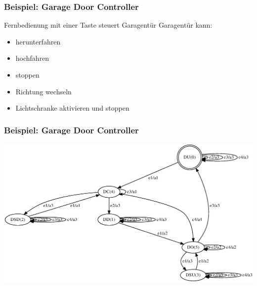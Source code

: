 \documentclass[10pt]{beamer}
\begin{document}
\begin{frame}
\frametitle{Beispiel: Garage Door Controller}
Fernbedienung mit einer Taste steuert Garagentür
Garagentür kann:
\begin{itemize}
	\item herunterfahren
	\item hochfahren
	\item stoppen
	\item Richtung wechseln
	\item Lichtschranke aktivieren und stoppen
\end{itemize}

\end{frame}
\begin{frame}
\frametitle{Beispiel: Garage Door Controller}
\centering
\includegraphics[width=1.15\textwidth]{images/gdc}

\end{frame}
\end{document}
